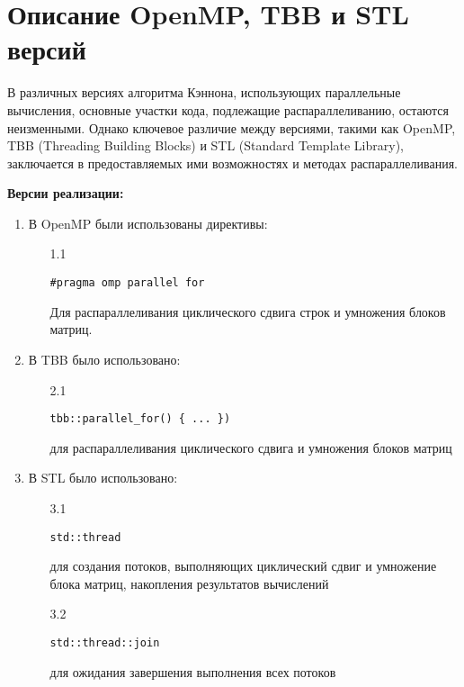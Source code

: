 \documentclass{report}
\begin{document}
\section* {Описание OpenMP, TBB и STL версий}
\par В различных версиях алгоритма Кэннона, использующих параллельные вычисления, основные участки кода, подлежащие распараллеливанию, остаются неизменными. Однако ключевое различие между версиями, такими как OpenMP, TBB (Threading Building Blocks) и STL (Standard Template Library), заключается в предоставляемых ими возможностях и методах распараллеливания.
\par \textbf{Версии реализации:}
\begin{enumerate}
\item В OpenMP были использованы директивы:
\vspace{0.5em}
\begin{enumerate}
\item[1.1] \begin{verbatim}
#pragma omp parallel for
\end{verbatim}

Для распараллеливания циклического сдвига строк и умножения блоков матриц.
\end{enumerate}
\item В TBB было использовано:
\vspace{0.5em}
\begin{enumerate}
\item[2.1] \begin{verbatim}
tbb::parallel_for() { ... })
\end{verbatim}
для распараллеливания циклического сдвига и умножения блоков матриц
\end{enumerate}
\item В STL было использовано:
\vspace{0.5em}
\begin{enumerate}
\item[3.1] \begin{verbatim}
std::thread
\end{verbatim}
для создания потоков, выполняющих циклический сдвиг и умножение блока матриц, накопления результатов вычислений
\item[3.2] \begin{verbatim}
std::thread::join
\end{verbatim}
для ожидания завершения выполнения всех потоков
\end{enumerate}
\end{enumerate}
\end{document}
